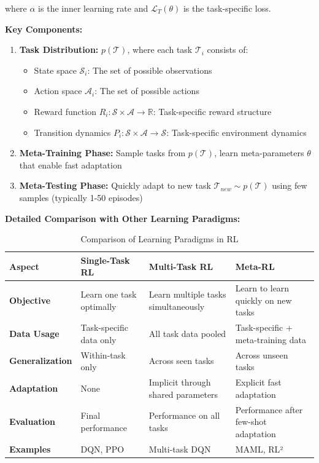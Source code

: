 \documentclass[12pt]{article}
\newcommand{\ieee}[1]{\textcolor{IEEEBlue}{\textbf{#1}}}
\begin{document}
{{			where $\alpha$ is the inner learning rate and $\mathcal{L}_T(\theta)$ is the task-specific loss.
			
			\ieee{Key Components:}
			
			\begin{enumerate}
				\item \textbf{Task Distribution:} $p(\mathcal{T})$, where each task $\mathcal{T}_i$ consists of:
				\begin{itemize}
					\item State space $\mathcal{S}_i$: The set of possible observations
					\item Action space $\mathcal{A}_i$: The set of possible actions
					\item Reward function $R_i: \mathcal{S} \times \mathcal{A} \rightarrow \mathbb{R}$: Task-specific reward structure
					\item Transition dynamics $P_i: \mathcal{S} \times \mathcal{A} \rightarrow \mathcal{S}$: Task-specific environment dynamics
				\end{itemize}
				\item \textbf{Meta-Training Phase:} Sample tasks from $p(\mathcal{T})$, learn meta-parameters $\theta$ that enable fast adaptation
				\item \textbf{Meta-Testing Phase:} Quickly adapt to new task $\mathcal{T}_{new} \sim p(\mathcal{T})$ using few samples (typically 1-50 episodes)
			\end{enumerate}
			
			\ieee{Detailed Comparison with Other Learning Paradigms:}
			
			\begin{table}[H]
			\centering
			\caption{Comparison of Learning Paradigms in RL}
			\label{tab:learning_paradigms}
			\begin{tabular}{|l|p{3cm}|p{3cm}|p{3cm}|}
			\hline
			\textbf{Aspect} & \textbf{Single-Task RL} & \textbf{Multi-Task RL} & \textbf{Meta-RL} \\
			\hline
			\textbf{Objective} & Learn one task optimally & Learn multiple tasks simultaneously & Learn to learn quickly on new tasks \\
			\hline
			\textbf{Data Usage} & Task-specific data only & All task data pooled & Task-specific + meta-training data \\
			\hline
			\textbf{Generalization} & Within-task only & Across seen tasks & Across unseen tasks \\
			\hline
			\textbf{Adaptation} & None & Implicit through shared parameters & Explicit fast adaptation \\
			\hline
			\textbf{Evaluation} & Final performance & Performance on all tasks & Performance after few-shot adaptation \\
			\hline
			\textbf{Examples} & DQN, PPO & Multi-task DQN & MAML, RL² \\
			\hline
			\end{tabular}
			\end{table}
			
}}
\end{document}
